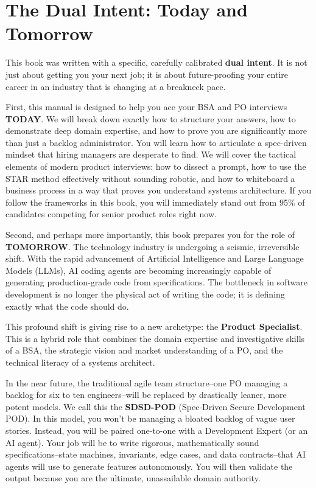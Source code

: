 \documentclass[
  11pt,
  openany,
  oneside]{book}
\begin{document}
\section{The Dual Intent: Today and
Tomorrow}\label{the-dual-intent-today-and-tomorrow}

This book was written with a specific, carefully calibrated \textbf{dual
intent}. It is not just about getting you your next job; it is about
future-proofing your entire career in an industry that is changing at a
breakneck pace.

First, this manual is designed to help you ace your BSA and PO
interviews \textbf{TODAY}. We will break down exactly how to structure
your answers, how to demonstrate deep domain expertise, and how to prove
you are significantly more than just a backlog administrator. You will
learn how to articulate a spec-driven mindset that hiring managers are
desperate to find. We will cover the tactical elements of modern product
interviews: how to dissect a prompt, how to use the STAR method
effectively without sounding robotic, and how to whiteboard a business
process in a way that proves you understand systems architecture. If you
follow the frameworks in this book, you will immediately stand out from
95\% of candidates competing for senior product roles right now.

Second, and perhaps more importantly, this book prepares you for the
role of \textbf{TOMORROW}. The technology industry is undergoing a
seismic, irreversible shift. With the rapid advancement of Artificial
Intelligence and Large Language Models (LLMs), AI coding agents are
becoming increasingly capable of generating production-grade code from
specifications. The bottleneck in software development is no longer the
physical act of writing the code; it is defining exactly what the code
should do.

This profound shift is giving rise to a new archetype: the
\textbf{Product Specialist}. This is a hybrid role that combines the
domain expertise and investigative skills of a BSA, the strategic vision
and market understanding of a PO, and the technical literacy of a
systems architect.

In the near future, the traditional agile team structure--one PO
managing a backlog for six to ten engineers--will be replaced by
drastically leaner, more potent models. We call this the
\textbf{SDSD-POD} (Spec-Driven Secure Development POD). In this model,
you won't be managing a bloated backlog of vague user stories. Instead,
you will be paired one-to-one with a Development Expert (or an AI
agent). Your job will be to write rigorous, mathematically sound
specifications--state machines, invariants, edge cases, and data
contracts--that AI agents will use to generate features autonomously.
You will then validate the output because you are the ultimate,
unassailable domain authority.
\end{document}
